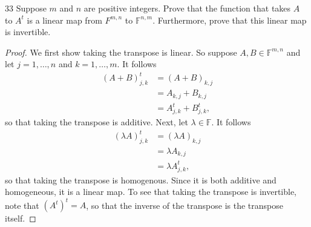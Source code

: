 \documentclass{extarticle}
\newenvironment{problem}[1]{\begin{prob*}{#1}{}}{\end{prob*}}
\newcommand{\F}{\mathbb{F}}
\begin{document}
\begin{problem}{33}
Suppose $m$ and $n$ are positive integers.  Prove that the function that takes $A$ to $A^t$ is a linear map from $F^{m,n}$ to $\F^{n,m}$.  Furthermore, prove that this linear map is invertible.
\end{problem}
\begin{proof}
We first show taking the transpose is linear.  So suppose $A,B\in\F^{m,n}$ and let $j = 1,\dots,n$ and $k = 1,\dots,m$.  It follows
\begin{align*}
(A+ B)^t_{j,k} &= (A + B)_{k, j}\\
&= A_{k, j} + B_{k ,j}\\
&= A^t_{j,k} + B^t_{j,k},
\end{align*}
so that taking the transpose is additive.  Next, let $\lambda\in\F$.  It follows
\begin{align*}
(\lambda A)^t_{j,k} &= (\lambda A)_{k, j}\\
&= \lambda A_{k,j}\\
&= \lambda A_{j,k}^t,
\end{align*}
so that taking the transpose is homogenous.  Since it is both additive and homogeneous, it is a linear map.  To see that taking the transpose is invertible, note that $(A^t)^t = A$, so that the inverse of the transpose is the transpose itself.
\end{proof}
\end{document}
